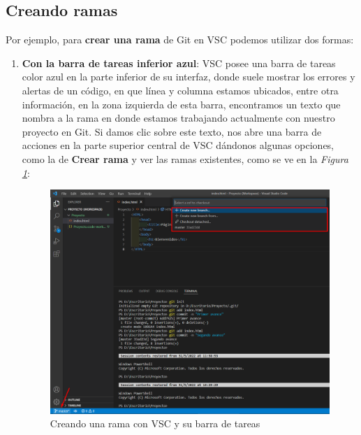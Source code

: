 \subsection{Creando ramas}
\hspace{0.55cm}Por ejemplo, para \textbf{crear una rama} de Git en VSC podemos utilizar dos formas:
\begin{enumerate}
    \item \textbf{Con la barra de tareas inferior azul}: VSC posee una barra de tareas color azul en la parte inferior de su interfaz, donde suele mostrar los errores y alertas de un código, en que línea y columna estamos ubicados, entre otra información, en la zona izquierda de esta barra, encontramos un texto que nombra a la rama en donde estamos trabajando actualmente con nuestro proyecto en Git. Si damos clic sobre este texto, nos abre una barra de acciones en la parte superior central de VSC dándonos algunas opciones, como la de \textbf{Crear rama} y ver las ramas existentes, como se ve en la \textit{Figura \ref{fig: 17}}:
    \begin{figure}[H]
        \centering
        \caption{Creando una rama con VSC y su barra de tareas}
        \label{fig: 17}
        \includegraphics[width=\textwidth]{capturas/creando_b1.png}
    \end{figure}
    

\end{enumerate}
